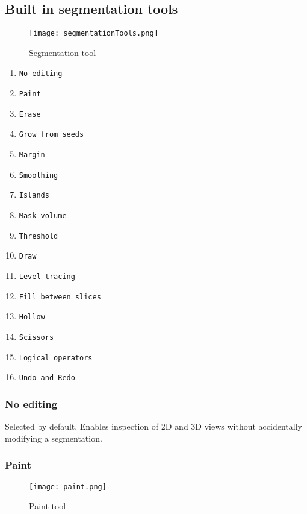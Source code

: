 \subsection{Built in segmentation tools}
\begin{figure}[h!]
	\centerline{
		\texttt{[image: segmentationTools.png]}}
	\caption{Segmentation tool}\label{fig:sT}
\end{figure}
\pagebreak
\begin{enumerate}
	\item \texttt{No editing}
	\item \texttt{Paint}
	\item \texttt{Erase}
	\item \texttt{Grow from seeds}
	\item \texttt{Margin}
	\item \texttt{Smoothing}
	\item \texttt{Islands}
	\item \texttt{Mask volume}
	\item \texttt{Threshold}
	\item \texttt{Draw}
	\item \texttt{Level tracing}
	\item \texttt{Fill between slices}
	\item \texttt{Hollow}
	\item \texttt{Scissors}
	\item \texttt{Logical operators}
	\item \texttt{Undo and Redo}
\end{enumerate}

\subsubsection{No editing}
Selected by default. Enables inspection of 2D and 3D views without accidentally modifying a segmentation.
\pagebreak
\subsubsection{Paint}\label{section:paint}
\begin{figure}[h]
	\begin{subfigure}{0.2\textwidth}
		
	\end{subfigure}
	\begin{subfigure}{0.2\textwidth}
		
	\end{subfigure}
\end{figure}
\begin{figure}[h!]
	\centerline{
		\texttt{[image: paint.png]}}
	\caption{Paint tool}\label{fig:paint}
\end{figure}

